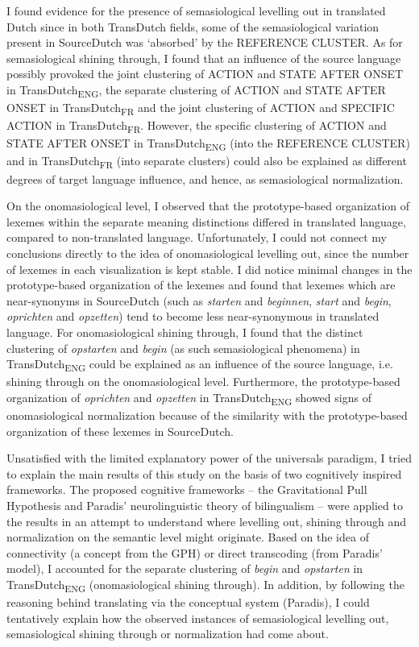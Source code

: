 I found evidence for the presence of semasiological levelling out in translated Dutch since in both TransDutch fields, some of the semasiological variation present in SourceDutch was ‘absorbed’ by the REFERENCE CLUSTER. As for semasiological shining through, I found that an influence of the source language possibly provoked the joint clustering of ACTION and STATE AFTER ONSET in TransDutch\textsubscript{ENG}, the separate clustering of ACTION and STATE AFTER ONSET in TransDutch\textsubscript{FR} and the joint clustering of ACTION and {SPECIFIC} ACTION in TransDutch\textsubscript{FR}. However, the specific clustering of ACTION and STATE AFTER ONSET in TransDutch\textsubscript{ENG} (into the REFERENCE CLUSTER) and in TransDutch\textsubscript{FR} (into separate clusters) could also be explained as different degrees of target language influence, and hence, as semasiological normalization.

On the onomasiological level, I observed that the prototype-based organization of lexemes within the separate meaning distinctions differed in translated language, compared to non-translated language. Unfortunately, I could not connect my conclusions directly to the idea of onomasiological levelling out, since the number of lexemes in each visualization is kept stable. I did notice minimal changes in the prototype-based organization of the lexemes and found that lexemes which are near-synonyms in SourceDutch (such as \textit{starten} and \textit{beginnen}, \textit{start} and \textit{begin}, \textit{oprichten} and \textit{opzetten}) tend to become less near-synonymous in translated language. For onomasiological shining through, I found that the distinct clustering of \textit{opstarten} and \textit{begin} (as such semasiological phenomena) in TransDutch\textsubscript{ENG} could be explained as an influence of the source language, i.e. shining through on the onomasiological level. Furthermore, the prototype-based organization of \textit{oprichten} and \textit{opzetten} in TransDutch\textsubscript{ENG} showed signs of onomasiological normalization because of the similarity with the prototype-based organization of these lexemes in SourceDutch.

Unsatisfied with the limited explanatory power of the universals paradigm, I tried to explain the main results of this study on the basis of two cognitively inspired frameworks. The proposed cognitive frameworks – the Gravitational Pull Hypothesis and Paradis’ neurolinguistic theory of bilingualism – were applied to the results in an attempt to understand where levelling out, shining through and normalization on the semantic level might originate. Based on the idea of connectivity (a concept from the GPH) or direct transcoding (from Paradis’ model), I accounted for the separate clustering of \textit{begin} and \textit{opstarten} in TransDutch\textsubscript{ENG} (onomasiological shining through). In addition, by following the reasoning behind translating via the conceptual system (Paradis), I could tentatively explain how the observed instances of semasiological levelling out, semasiological shining through or normalization had come about.

